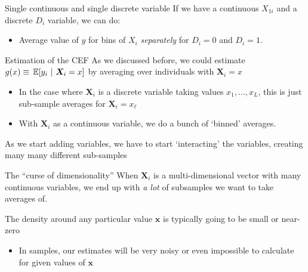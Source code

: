 \documentclass[aspectratio=169,t,11pt,table]{beamer}
\begin{document}

\begin{frame}{Single continuous and single discrete variable}
  If we have a continuous $X_{1i}$ and a discrete $D_i$ variable, we can do:
  \begin{itemize}
    \item Average value of $y$ for bins of $X_i$ \emph{separately} for $D_i = 0$ and $D_i = 1$. 
  \end{itemize}
\end{frame}

\begin{frame}{Estimation of the CEF}
  As we discussed before, we could estimate $g(x) \equiv \expec{y_i}{\bm{X}_i = x}$ by averaging over individuals with $\bm{X}_i = x$
  \begin{itemize}
    \item In the case where $\bm{X}_i$ is a discrete variable taking values $x_1, \dots, x_L$, this is just sub-sample averages for $\bm{X}_i = x_\ell$
    
    \item With $\bm{X}_i$ as a continuous variable, we do a bunch of `binned' averages.
  \end{itemize}

  \bigskip
  As we start adding variables, we have to start `interacting' the variables, creating many many different sub-samples
\end{frame}

\begin{frame}{The ``curse of dimensionality''}
  When $\bm{X}_i$ is a multi-dimensional vector with many continuous variables, we end up with \emph{a lot} of subsamples we want to take averages of. 

  \bigskip
  The density around any particular value $\bm{x}$ is typically going to be small or near-zero 
  \begin{itemize}
    \item In samples, our estimates will be very noisy or even impossible to calculate for given values of $\bm{x}$ 
  \end{itemize}
\end{frame}
\end{document}
